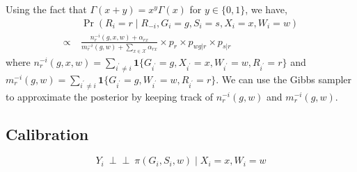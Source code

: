\documentclass[11pt]{article}
\theoremstyle{plain}
\newcommand{\ind}{\mbox{$\perp\!\!\!\perp$}}
\newcommand\spacingset[1]{\renewcommand{\baselinestretch}%
  {#1}\small\normalsize}
\newcommand{\cX}{\mathcal{X}}
\begin{document}
Using the fact that $\Gamma(x+y)=x^y\Gamma(x)$ for $y \in \{0,1\}$, we
have,
\begin{align}
  & \Pr(R_i = r \mid R_{-i}, G_i = g, S_i = s, X_i = x, W_i = w) \\
  \propto \ &
              \frac{n_r^{-i}(g,x,w)+\alpha_{rx}}{m_r^{-i}(g,w)+\sum_{x
              \in \cX}\alpha_{rx}} \times p_r \times p_{wg|r}
              \times p_{s|r}
\end{align}
where
$n_r^{-i}(g,x,w) = \sum_{i^\prime\ne i} \mathbf{1}\{G_{i^\prime} = g,
X_{i^\prime} = x, W_{i^\prime} = w, R_{i^\prime} = r\}$ and
$m_r^{-i}(g,w)=\sum_{i^\prime\ne i} \mathbf{1}\{G_{i^\prime} = g,
W_{i^\prime} = w, R_{i^\prime} = r\}$.  We can use the Gibbs sampler
to approximate the posterior by keeping track of $n_r^{-i}(g,w)$ and
$m_r^{-i}(g,w)$.

\subsection{Calibration}

\begin{equation}
  Y_i \ \ind \ \pi(G_i, S_i, w) \mid X_i = x, W_i = w
\end{equation}

\spacingset{1.5}

\end{document}
